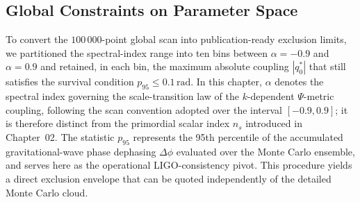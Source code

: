 \documentclass[11pt, a4paper]{article}
\begin{document}
\subsection*{Global Constraints on Parameter Space}
To convert the $100\,000$-point global scan into publication-ready exclusion limits, we partitioned the spectral-index range into ten bins between $\alpha=-0.9$ and $\alpha=0.9$ and retained, in each bin, the maximum absolute coupling $|q_0^*|$ that still satisfies the survival condition $p_{95} \leq 0.1\,\mathrm{rad}$. In this chapter, $\alpha$ denotes the spectral index governing the scale-transition law of the $k$-dependent $\Psi$-metric coupling, following the scan convention adopted over the interval $[-0.9, 0.9]$; it is therefore distinct from the primordial scalar index $n_s$ introduced in Chapter~02. The statistic $p_{95}$ represents the 95th percentile of the accumulated gravitational-wave phase dephasing $\Delta\phi$ evaluated over the Monte Carlo ensemble, and serves here as the operational LIGO-consistency pivot. This procedure yields a direct exclusion envelope that can be quoted independently of the detailed Monte Carlo cloud.
\end{document}
